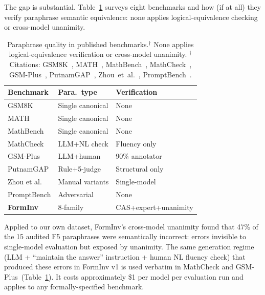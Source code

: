 \documentclass{article}
\begin{document}
The gap is substantial.
Table~\ref{tab:benchmark_audit} surveys eight benchmarks and how (if at all) they verify paraphrase semantic equivalence:
none applies logical-equivalence checking or cross-model unanimity.

\begin{table}[h]\centering\small
\caption{Paraphrase quality in published benchmarks.$^{\dagger}$
None applies logical-equivalence verification or cross-model unanimity.
$^{\dagger}$Citations: GSM8K~\citep{cobbe2021gsm},
MATH~\citep{hendrycks2021math},
MathBench~\citep{liu2024mathbench},
MathCheck~\citep{zhou2024mathcheck},
GSM-Plus~\citep{paster2024gsmplus},
PutnamGAP~\citep{hao2025putnambench},
Zhou~et~al.~\citep{zhou2024surface},
PromptBench~\citep{zhu2024promptbench}.}
\label{tab:benchmark_audit}
\begin{tabular}{lll}
\toprule
Benchmark & Para.\ type & Verification \\
\midrule
GSM8K          & Single canonical & None \\
MATH           & Single canonical & None \\
MathBench      & Single canonical & None \\
MathCheck      & LLM+NL check    & Fluency only \\
GSM-Plus       & LLM+human       & 90\% annotator \\
PutnamGAP      & Rule+5-judge    & Structural only \\
Zhou et al.    & Manual variants & Single-model \\
PromptBench    & Adversarial     & None \\
\midrule
\textbf{FormInv} & 8-family       & CAS+expert+unanimity \\
\bottomrule
\end{tabular}
\end{table}

Applied to our own dataset, FormInv's cross-model unanimity found that 47\% of the 15 audited F5 paraphrases were
semantically incorrect: errors invisible to single-model evaluation but exposed by unanimity.
The same generation regime (LLM + ``maintain the answer'' instruction + human NL fluency check)
that produced these errors in FormInv v1 is used verbatim in MathCheck and GSM-Plus~(Table~\ref{tab:benchmark_audit}).
It costs approximately \$1 per model per evaluation run and applies to any formally-specified benchmark.
\end{document}
